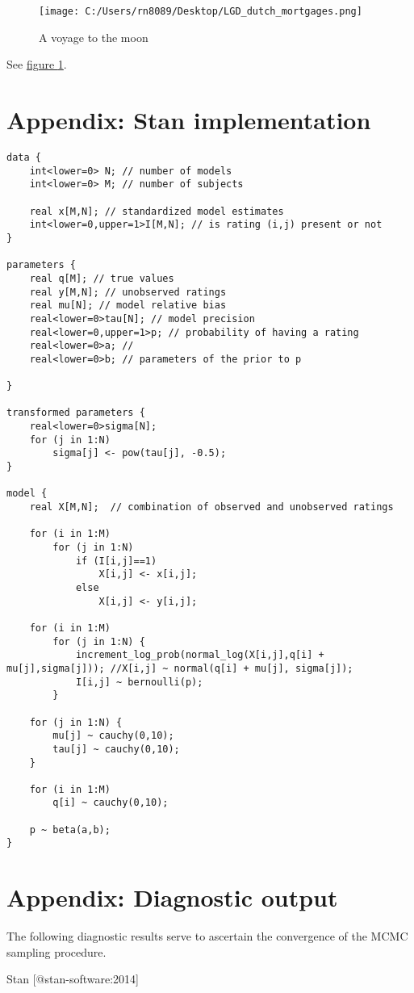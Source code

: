 \documentclass[]{article}
\begin{document}
\begin{figure}[htbp]
\centering
\texttt{[image: C:/Users/rn8089/Desktop/LGD\_dutch\_mortgages.png]}
\caption{A voyage to the moon\label{fig:lalune}}
\end{figure}

See \hyperref[fig:lalune]{figure \ref{fig:lalune}}.

\section{Appendix: Stan
implementation}\label{appendix-stan-implementation}

\begin{verbatim}
data {
    int<lower=0> N; // number of models      
    int<lower=0> M; // number of subjects

    real x[M,N]; // standardized model estimates
    int<lower=0,upper=1>I[M,N]; // is rating (i,j) present or not
}

parameters {
    real q[M]; // true values
    real y[M,N]; // unobserved ratings
    real mu[N]; // model relative bias
    real<lower=0>tau[N]; // model precision
    real<lower=0,upper=1>p; // probability of having a rating
    real<lower=0>a; // 
    real<lower=0>b; // parameters of the prior to p

}

transformed parameters {    
    real<lower=0>sigma[N];
    for (j in 1:N)
        sigma[j] <- pow(tau[j], -0.5);
}

model {
    real X[M,N];  // combination of observed and unobserved ratings

    for (i in 1:M)
        for (j in 1:N)
            if (I[i,j]==1)
                X[i,j] <- x[i,j];
            else
                X[i,j] <- y[i,j];

    for (i in 1:M)
        for (j in 1:N) {
            increment_log_prob(normal_log(X[i,j],q[i] + mu[j],sigma[j])); //X[i,j] ~ normal(q[i] + mu[j], sigma[j]);    
            I[i,j] ~ bernoulli(p);
        }

    for (j in 1:N) {
        mu[j] ~ cauchy(0,10);
        tau[j] ~ cauchy(0,10);
    }

    for (i in 1:M)
        q[i] ~ cauchy(0,10);

    p ~ beta(a,b);
}
\end{verbatim}

\section{Appendix: Diagnostic output}\label{appendix-diagnostic-output}

The following diagnostic results serve to ascertain the convergence of
the MCMC sampling procedure.

Stan {[}@stan-software:2014{]}
\end{document}
